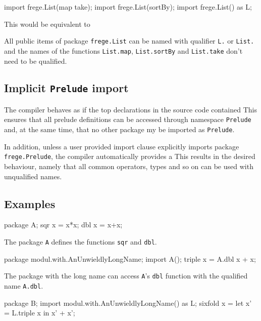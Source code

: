 \begin{code}
import frege.List(map take);
import frege.List(sortBy);
import frege.List() as L;
\end{code}

This would be equivalent to 

All public items of package \texttt{frege.List} can be named with qualifier \texttt{L.} or \texttt{List.} 
and the names of the functions \texttt{List.map},  \texttt{List.sortBy} and  \texttt{List.take} don't need to be qualified.

\subsection{Implicit \texttt{Prelude} import}
The compiler behaves as if the top declarations in
the source code contained
This ensures that all prelude definitions can be accessed through
namespace \texttt{Prelude} and, at the same time, that no other package my be imported as {\tt Prelude}.


In addition, unless a user provided import clause explicitly imports package \texttt{frege.Prelude}, the
compiler automatically provides a
This results
in the desired behaviour, namely that all common operators, types and
so on can be used with unqualified names.


\subsection{Examples}

\begin{code}
package A;
sqr x = x*x;
dbl x = x+x;
\end{code}

The package {\tt A} defines the functions
{\tt sqr} and {\tt dbl}.

\begin{code}
package modul.with.AnUnwieldlyLongName;
import A();
triple x = A.dbl x + x;
\end{code}

The package with the long name can
access
{\tt A}'s {\tt dbl} function with the qualified name
{\tt A.dbl}.

\begin{code}
package B;
import modul.with.AnUnwieldlyLongName() as L;
sixfold x = let x' = L.triple x in x' + x';
\end{code}

